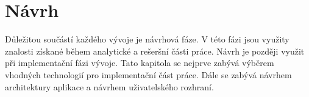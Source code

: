\chapter{Návrh}\label{kapitola-navrh}
Důležitou součástí každého vývoje je návrhová fáze. V této fázi jsou využity znalosti získané během analytické a rešeršní části práce. Návrh je později využit při implementační fázi vývoje. Tato kapitola se nejprve zabývá výběrem vhodných technologií pro implementační část práce.
Dále se zabývá návrhem architektury aplikace a návrhem uživatelského rozhraní.




